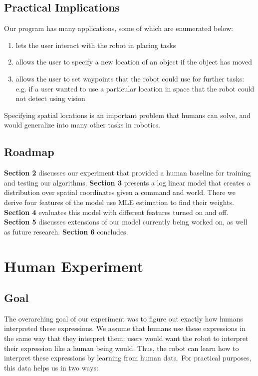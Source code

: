 \documentclass[12pt,letterpaper]{article}
\begin{document}
\subsection{Practical Implications}

Our program has many applications, some of which are enumerated below:

\begin{enumerate}[(1)]
\item lets the user interact with the robot in placing tasks
\item allows the user to specify a new location of an object if the object has moved
\item allows the user to set waypoints that the robot could use for further tasks: e.g. if a user wanted to use a particular location in space that the robot could not detect using vision 
\end{enumerate}

Specifying spatial locations is an important problem that humans can solve, and would generalize into many other tasks in robotics. 

\subsection{Roadmap}

\textbf{Section 2} discusses our experiment that provided a human baseline for training and testing our algorithms. \textbf{Section 3} presents a log linear model that creates a distribution over spatial coordinates given a command and world. There we derive four features of the model use MLE estimation to find their weights. \textbf{Section 4} evaluates this model with different features turned on and off. \textbf{Section 5} discusses extensions of our model currently being worked on, as well as future research. \textbf{Section 6} concludes.

\section{Human Experiment}

\subsection{Goal}

The overarching goal of our experiment was to figure out exactly how humans interpreted these expressions. We assume that humans use these expressions in the same way that they interpret them: users would want the robot to interpret their expression like a human being would. Thus, the robot can learn how to interpret these expressions by learning from human data. For practical purposes, this data helps us in two ways:
\end{document}
